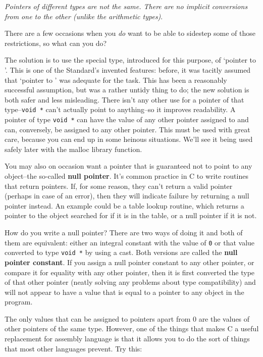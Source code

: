    \textit{Pointers of different types are not the same. There are no
    implicit conversions from one to the other (unlike the arithmetic
    types)}.


   There are a few occasions when you \textit{do} want to be able to
    sidestep some of those restrictions, so what can you do?


   The solution is to use the special type, introduced for this purpose,
    of `pointer to \void{}'. This is one of the Standard's
    invented features: before, it was tacitly assumed that `pointer to
    \kchar' was adequate for the task. This has been
    a reasonably successful assumption, but was a rather untidy thing to do;
    the new solution is both safer and less misleading. There isn't any
    other use for a pointer of that type--\texttt{void *} can't
    actually point to anything--so it improves readability. A pointer of
    type \texttt{void *} can have the value of any other pointer
    assigned to and can, conversely, be assigned to any other pointer. This
    must be used with great care, because you can end up in some heinous
    situations. We'll see it being used safely later with the malloc library
    function.


   You may also on occasion want a pointer that is guaranteed not to
    point to any object--the so-called \textbf{null pointer}. It's
    common practice in C to write routines that return pointers. If, for
    some reason, they can't return a valid pointer (perhaps in case of an
    error), then they will indicate failure by returning a null pointer
    instead. An example could be a table lookup routine, which returns
    a pointer to the object searched for if it is in the table, or a null
    pointer if it is not.


   How do you write a null pointer? There are two ways of doing it and
    both of them are equivalent: either an integral constant with the value
    of \texttt{0} or that value converted to type \texttt{void *} by
    using a cast. Both versions are called the \textbf{null pointer
    constant}. If you assign a null pointer constant to any other
    pointer, or compare it for equality with any other pointer, then it is
    first converted the type of that other pointer (neatly solving any
    problems about type compatibility) and will not appear to have a value
    that is equal to a pointer to any object in the program.


   The only values that can be assigned to pointers apart from 0 are the
    values of other pointers of the same type. However, one of the things
    that makes C a useful replacement for assembly language is that it
    allows you to do the sort of things that most other languages prevent.
    Try this:


